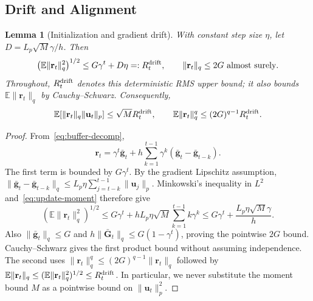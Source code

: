 \documentclass{article}
\newtheorem{lemma}{Lemma}
\begin{document}
\subsection{Drift and Alignment}
\begin{lemma}[Initialization and gradient drift]\label{lemma:drift}
With constant step size $\eta$, let $D=L_p\sqrt M\gamma/h$. Then
\begin{equation}\label{eq:drift-rms}
\left(\mathbb E\|\mathbf{r}_t\|_q^2\right)^{1/2}\le G\gamma^t+D\eta=:R_t^{\rm drift},
\qquad \|\mathbf{r}_t\|_q\le2G\ \text{almost surely}.
\end{equation}
Throughout, $R_t^{\rm drift}$ denotes this deterministic RMS upper bound; it also bounds $\mathbb E\|\mathbf r_t\|_q$ by Cauchy--Schwarz. Consequently,
\begin{equation}\label{eq:drift-products}
\mathbb E[\|\mathbf{r}_t\|_q\|\mathbf{u}_t\|_p]\le\sqrt M R_t^{\rm drift},
\qquad \mathbb E\|\mathbf{r}_t\|_q^q\le(2G)^{q-1}R_t^{\rm drift}.
\end{equation}
\end{lemma}
\begin{proof}
From~\eqref{eq:buffer-decomp},
\begin{equation}
\mathbf{r}_t=\gamma^t\bar{\mathbf{g}}_t+h\sum_{k=1}^{t-1}\gamma^k(\bar{\mathbf{g}}_t-\bar{\mathbf{g}}_{t-k}).
\end{equation}
The first term is bounded by $G\gamma^t$. By the gradient Lipschitz assumption,
$\|\bar{\mathbf{g}}_t-\bar{\mathbf{g}}_{t-k}\|_q\le L_p\eta\sum_{j=t-k}^{t-1}\|\mathbf{u}_j\|_p$.
Minkowski's inequality in $L^2$ and~\eqref{eq:update-moment} therefore give
\begin{equation}
(\mathbb E\|\mathbf{r}_t\|_q^2)^{1/2}
\le G\gamma^t+hL_p\eta\sqrt M\sum_{k=1}^{t-1}k\gamma^k
\le G\gamma^t+\frac{L_p\eta\sqrt M\gamma}{h}.
\end{equation}
Also $\|\bar{\mathbf{g}}_t\|_q\le G$ and $h\|\bar{\mathbf{G}}_t\|_q\le G(1-\gamma^t)$, proving the pointwise $2G$ bound. Cauchy--Schwarz gives the first product bound without assuming independence. The second uses $\|\mathbf{r}_t\|_q^q\le(2G)^{q-1}\|\mathbf{r}_t\|_q$ followed by $\mathbb E\|\mathbf r_t\|_q\le(\mathbb E\|\mathbf r_t\|_q^2)^{1/2}\le R_t^{\rm drift}$. In particular, we never substitute the moment bound $M$ as a pointwise bound on $\|\mathbf{u}_t\|_p^2$.
\end{proof}
\end{document}
